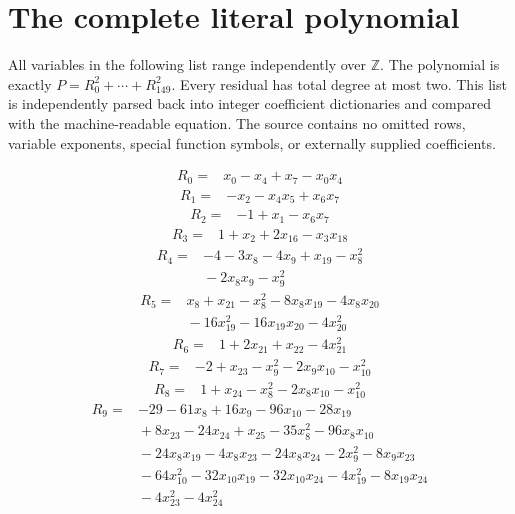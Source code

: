 \documentclass[11pt]{article}
\theoremstyle{definition}
\theoremstyle{remark}
\newcommand{\Z}{\mathbb Z}
\begin{document}
\clearpage
\appendix
\section{The complete literal polynomial}\label{app:residuals}

All variables in the following list range independently over $\Z$.
The polynomial is exactly $P=R_0^2+\cdots+R_{149}^2$. Every residual
has total degree at most two. This list is independently parsed back into
integer coefficient dictionaries and compared with the machine-readable
equation. The source contains no omitted rows, variable exponents, special
function symbols, or externally supplied coefficients.

\begingroup\small
\setlength{\jot}{2pt}
\begin{align*}
R_{0} ={}& x_{0} - x_{4} + x_{7} - x_{0} x_{4}
\end{align*}
\begin{align*}
R_{1} ={}& -x_{2} - x_{4} x_{5} + x_{6} x_{7}
\end{align*}
\begin{align*}
R_{2} ={}& -1 + x_{1} - x_{6} x_{7}
\end{align*}
\begin{align*}
R_{3} ={}& 1 + x_{2} + 2x_{16} - x_{3} x_{18}
\end{align*}
\begin{align*}
R_{4} ={}& -4 - 3x_{8} - 4x_{9} + x_{19} - x_{8}^{2} \\
&{} -2x_{8} x_{9} - x_{9}^{2}
\end{align*}
\begin{align*}
R_{5} ={}& x_{8} + x_{21} - x_{8}^{2} - 8x_{8} x_{19} - 4x_{8} x_{20} \\
&{} -16x_{19}^{2} - 16x_{19} x_{20} - 4x_{20}^{2}
\end{align*}
\begin{align*}
R_{6} ={}& 1 + 2x_{21} + x_{22} - 4x_{21}^{2}
\end{align*}
\begin{align*}
R_{7} ={}& -2 + x_{23} - x_{9}^{2} - 2x_{9} x_{10} - x_{10}^{2}
\end{align*}
\begin{align*}
R_{8} ={}& 1 + x_{24} - x_{8}^{2} - 2x_{8} x_{10} - x_{10}^{2}
\end{align*}
\begin{align*}
R_{9} ={}& -29 - 61x_{8} + 16x_{9} - 96x_{10} - 28x_{19} \\
&{} + 8x_{23} - 24x_{24} + x_{25} - 35x_{8}^{2} - 96x_{8} x_{10} \\
&{} -24x_{8} x_{19} - 4x_{8} x_{23} - 24x_{8} x_{24} - 2x_{9}^{2} - 8x_{9} x_{23} \\
&{} -64x_{10}^{2} - 32x_{10} x_{19} - 32x_{10} x_{24} - 4x_{19}^{2} - 8x_{19} x_{24} \\
&{} -4x_{23}^{2} - 4x_{24}^{2}
\end{align*}
\end{document}
